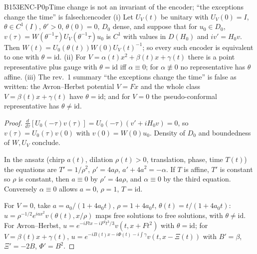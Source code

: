 \begin{dimcard}{B153}{ENC-P0p}{Time change is not an invariant of the encoder; ``the exceptions change the time'' is false}{\pw}{ch:encoder}
(i) Let $U_V(t)$ be unitary with $U_V(0)=I$, $\theta\in C^1(I)$, $\theta'>0$, $\theta(0)=0$, $D_0$ dense, and suppose that for $u_0\in D_0$, $v(\tau)=W(\theta^{-1}\tau)U_V(\theta^{-1}\tau)u_0$ is $C^1$ with values in $D(H_0)$ and $iv'=H_0v$. Then $W(t)=U_0(\theta(t))W(0)U_V(t)^{-1}$; so every such encoder is equivalent to one with $\theta=\mathrm{id}$. (ii) For $V=\alpha(t)x^2+\beta(t)x+\gamma(t)$ there is a point representative plus gauge with $\theta=\mathrm{id}$ iff $\alpha\equiv0$; for $\alpha\not\equiv0$ no representative has $\theta$ affine. (iii) The rev.~1 summary ``the exceptions change the time'' is false as written: the Avron--Herbst potential $V=Fx$ and the whole class $V=\beta(t)x+\gamma(t)$ have $\theta=\mathrm{id}$; and for $V=0$ the pseudo-conformal representative has $\theta\ne\mathrm{id}$.
\end{dimcard}

\begin{proof}
$\frac{d}{d\tau}[U_0(-\tau)v(\tau)]=U_0(-\tau)(v'+iH_0v)=0$, so $v(\tau)=U_0(\tau)v(0)$ with $v(0)=W(0)u_0$. Density of $D_0$ and boundedness of $W,U_V$ conclude.

In the ansatz (chirp $a(t)$, dilation $\rho(t)>0$, translation, phase, time $T(t)$) the equations are $T'=1/\rho^2$, $\rho'=4a\rho$, $a'+4a^2=-\alpha$. If $T$ is affine, $T'$ is constant so $\rho$ is constant, then $a\equiv0$ by $\rho'=4a\rho$, and $\alpha\equiv0$ by the third equation. Conversely $\alpha\equiv0$ allows $a=0$, $\rho=1$, $T=\mathrm{id}$.

For $V=0$, take $a=a_0/(1+4a_0t)$, $\rho=1+4a_0t$, $\theta(t)=t/(1+4a_0t)$: $u=\rho^{-1/2}e^{iax^2}v(\theta(t),x/\rho)$ maps free solutions to free solutions, with $\theta\ne\mathrm{id}$. For Avron--Herbst, $u=e^{-iFtx-iF^2t^3/3}v(t,x+Ft^2)$ with $\theta=\mathrm{id}$; for $V=\beta(t)x+\gamma(t)$, $u=e^{-iB(t)x-i\Phi(t)-i\int\gamma}v(t,x-\Xi(t))$ with $B'=\beta$, $\Xi'=-2B$, $\Phi'=B^2$.

\end{proof}


